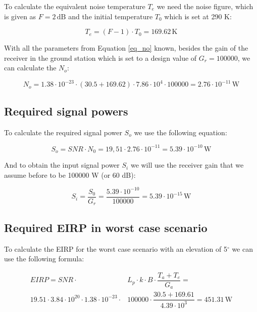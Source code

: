 \documentclass[a4paper,12pt,calibri,oneside,openany]{book}
\newcommand{\unit}[1]{\ensuremath{\, \mathrm{#1}}}
\theoremstyle{break}
\begin{document}
		To calculate the equivalent noise temperature $T_{e}$ we need the noise figure, which is given as $F=2 \unit{dB}$ and the initial temperature $T_{0}$ which is set at 290 K:
		
		\begin{equation} \label{eq_te}
			T_{e} = (F - 1) \cdot T_{0} = 169.62 \unit{K} 
		\end{equation}
	 	
	 	With all the parameters from Equation \ref{eq_no} known, besides the  gain of the receiver in the ground station which is set to a design value of $G_{r}= 100000$, we can calculate the $N_{o}$:
	 	
	 	\begin{equation} \label{eq_no2}
	 		N_{o} = 1.38 \cdot 10^{-23} \cdot \left(30.5 + 169.62 \right) \cdot 7.86 \cdot 10^{4} \cdot 100000 = 2.76 \cdot 10^{-11} \unit{W}
	 	\end{equation}
	 		
	\subsection{Required signal powers}
	
		To calculate the required signal power $S_{o}$ we use the following equation:
	
		\begin{equation} \label{eq_so}
			S_{o} = SNR \cdot N_{0} = 19,51 \cdot 2.76 \cdot 10^{-11} = 5.39 \cdot 10^{-10}  \unit{W}
		\end{equation}
	
		And to obtain the input signal power $S_{i}$ we will use the receiver gain that we assume before to be 100000 W (or 60 dB):
		
		\begin{equation} \label{eq_si}
			S_{i} = \dfrac{S_{0}}{G_{r}}= \dfrac{5.39 \cdot 10^{-10}}{100000} = 5.39 \cdot 10^{-15}  \unit{W}
		\end{equation}		
	
	\subsection{Required EIRP in worst case scenario}
	
		To calculate the EIRP for the worst case scenario with an elevation of 5$^{\circ}$ we can use the following formula:
		
		\begin{equation} \label{eq_eirp}
		\begin{split}
			EIRP = SNR \cdot &L_{p} \cdot k \cdot B \cdot \dfrac{T_{a}+T_{e}}{G_{a}} = \\
			19.51  \cdot 3.84 \cdot 10^{20} \cdot 1.38 \cdot 10^{-23} \cdot &100000 \cdot \dfrac{30.5+169.61}{4.39 \cdot 10^{3}} = 451.31	 \unit{W}
		\end{split}
		\end{equation}
	
\end{document}
